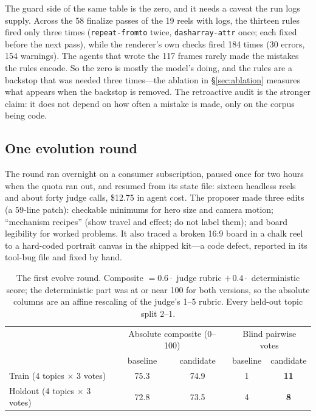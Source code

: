 \documentclass[11pt]{article}
\begin{document}
The guard side of the same table is the zero, and it needs a caveat the run logs supply. Across the
58 finalize passes of the 19 reels with logs, the thirteen rules fired only three times
(\texttt{repeat-fromto} twice, \texttt{dasharray-attr} once; each fixed before the next pass), while
the renderer's own checks fired 184 times (30 errors, 154 warnings). The agents that wrote the 117
frames rarely made the mistakes the rules encode. So the zero is mostly the model's doing, and the
rules are a backstop that was needed three times---the ablation in \S\ref{sec:ablation} measures what
appears when the backstop is removed. The retroactive audit is the stronger claim: it does not depend
on how often a mistake is made, only on the corpus being code.

\subsection{One evolution round}
\label{sec:evolve}
The round ran overnight on a consumer subscription, paused once for two hours when the quota ran
out, and resumed from its state file: sixteen headless reels and about forty judge calls, \$12.75 in
agent cost. The proposer made three edits (a 59-line patch): checkable minimums for hero size and
camera motion; ``mechanism recipes'' (show travel and effect; do not label them); and board legibility
for worked problems. It also traced a broken 16:9 board in a chalk reel to a hard-coded portrait
canvas in the shipped kit---a code defect, reported in its tool-bug file and fixed by hand.

\begin{table}[t]
\centering\small
\begin{tabular}{lcc|cc}
\toprule
 & \multicolumn{2}{c|}{Absolute composite (0--100)} & \multicolumn{2}{c}{Blind pairwise votes} \\
 & baseline & candidate & baseline & candidate \\
\midrule
Train (4 topics $\times$ 3 votes) & 75.3 & 74.9 & 1 & \textbf{11} \\
Holdout (4 topics $\times$ 3 votes) & 72.8 & 73.5 & 4 & \textbf{8} \\
\bottomrule
\end{tabular}
\caption{The first evolve round. Composite $= 0.6 \cdot$ judge rubric $+\, 0.4 \cdot$ deterministic
score; the deterministic part was at or near 100 for both versions, so the absolute columns are an
affine rescaling of the judge's 1--5 rubric. Every held-out topic split 2--1.}
\label{tab:evolve}
\end{table}
\end{document}
